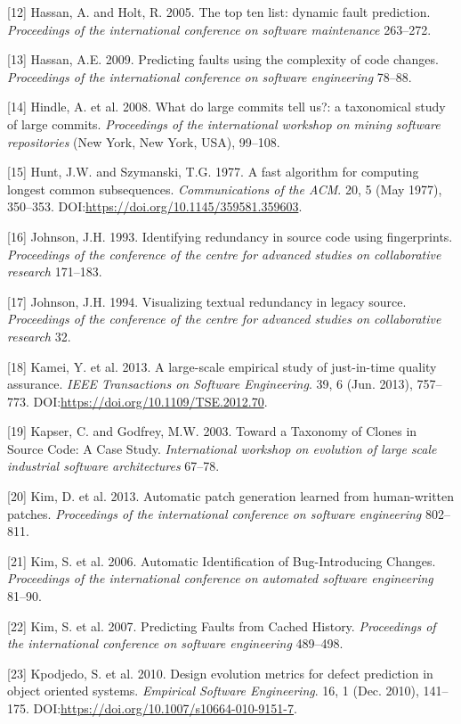 \documentclass[sigconf]{acmart}
\begin{document}
[12] Hassan, A. and Holt, R. 2005. The top ten list: dynamic fault
prediction. \emph{Proceedings of the international conference on
software maintenance} 263--272.


[13] Hassan, A.E. 2009. Predicting faults using the complexity of
code changes. \emph{Proceedings of the international conference on
software engineering} 78--88.


[14] Hindle, A. et al. 2008. What do large commits tell us?: a
taxonomical study of large commits. \emph{Proceedings of the
international workshop on mining software repositories} (New York, New
York, USA), 99--108.


[15] Hunt, J.W. and Szymanski, T.G. 1977. A fast algorithm for
computing longest common subsequences. \emph{Communications of the ACM}.
20, 5 (May 1977), 350--353.
DOI:\url{https://doi.org/10.1145/359581.359603}.


[16] Johnson, J.H. 1993. Identifying redundancy in source code using
fingerprints. \emph{Proceedings of the conference of the centre for
advanced studies on collaborative research} 171--183.


[17] Johnson, J.H. 1994. Visualizing textual redundancy in legacy
source. \emph{Proceedings of the conference of the centre for advanced
studies on collaborative research} 32.


[18] Kamei, Y. et al. 2013. A large-scale empirical study of
just-in-time quality assurance. \emph{IEEE Transactions on Software
Engineering}. 39, 6 (Jun. 2013), 757--773.
DOI:\url{https://doi.org/10.1109/TSE.2012.70}.


[19] Kapser, C. and Godfrey, M.W. 2003. Toward a Taxonomy of Clones
in Source Code: A Case Study. \emph{International workshop on evolution
of large scale industrial software architectures} 67--78.


[20] Kim, D. et al. 2013. Automatic patch generation learned from
human-written patches. \emph{Proceedings of the international conference
on software engineering} 802--811.


[21] Kim, S. et al. 2006. Automatic Identification of
Bug-Introducing Changes. \emph{Proceedings of the international
conference on automated software engineering} 81--90.


[22] Kim, S. et al. 2007. Predicting Faults from Cached History.
\emph{Proceedings of the international conference on software
engineering} 489--498.


[23] Kpodjedo, S. et al. 2010. Design evolution metrics for defect
prediction in object oriented systems. \emph{Empirical Software
Engineering}. 16, 1 (Dec. 2010), 141--175.
DOI:\url{https://doi.org/10.1007/s10664-010-9151-7}.
\end{document}
